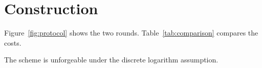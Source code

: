 \section{Construction}\label{sec:construction}
Figure~\ref{fig:protocol} shows the two rounds. Table~\ref{tab:comparison} compares the costs.


\begin{theorem}\label{thm:unforgeable}
The scheme is unforgeable under the discrete logarithm assumption.
\end{theorem}
